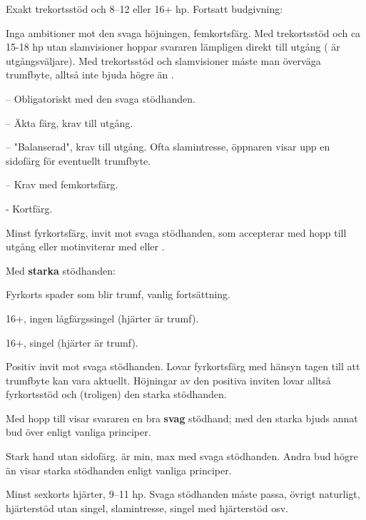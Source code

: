 Exakt trekortsstöd och 8--12 eller 16+ hp.
Fortsatt budgivning:
\begin{beskriv}
   \item[\hj{2}] Inga ambitioner mot den svaga höjningen, femkortsfärg. Med
                 trekortsstöd och ca 15-18 hp utan slamvisioner hoppar
svararen lämpligen direkt till utgång ( är utgångsväljare). Med
trekortsstöd och slamvisioner måste man överväga trumfbyte, alltså inte
bjuda högre än . 
	\begin{beskriv}
	   \item[--\pass] Obligatoriskt med den svaga stödhanden.
	   \item[--\spa{2}] Äkta färg, krav till utgång.
	   \item[--\NT{2}] "Balanserad", krav till utgång.
                           Ofta slamintresse, öppnaren visar upp en
                           sidofärg för eventuellt trumfbyte.
	   \item[--\la{3}] Krav med femkortsfärg.
	   \item[- \la{4}] Kortfärg.
	\end{beskriv}
      \item[\spa{2}] Minst fyrkortsfärg, invit mot svaga stödhanden, som
        accepterar med hopp till utgång eller motinviterar med  eller
        .

        Med {\bf starka} stödhanden:
        \begin{beskriv}
          \item[\spa{3}] Fyrkorts spader som blir trumf, vanlig
            fortsättning.
          \item[\NT{3}] 16+, ingen lågfärgssingel (hjärter är trumf).
          \item[\la{4}] 16+, singel (hjärter är trumf).
        \end{beskriv}    
      \item[\la{3}] Positiv invit mot svaga stödhanden. Lovar
fyrkortsfärg med hänsyn tagen till att trumfbyte kan vara aktuellt.
Höjningar av den positiva inviten lovar alltså fyrkortsstöd och (troligen)
den starka stödhanden.

Med hopp till  visar svararen en bra {\bf svag} stödhand; med den
starka bjuds annat bud över  enligt vanliga principer. 
   \item[\NT{2}] Stark hand utan sidofärg.  är min,  max med
     svaga stödhanden. Andra bud högre än  visar starka stödhanden enligt
     vanliga principer.
   \item[\hj{3}] Minst sexkorts hjärter, 9--11 hp. Svaga stödhanden måste
passa, övrigt naturligt,  hjärterstöd
utan singel, slamintresse,  singel med hjärterstöd osv.
\end{beskriv}

